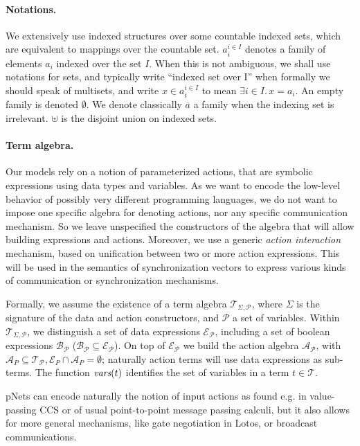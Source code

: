 \documentclass{lncs/llncs}
\def\AlgT{\mathcal{T}}
\renewcommand{\P}{\mathcal P}
\begin{document}
\paragraph*{Notations.}
We extensively use indexed structures
over some countable indexed sets, which are equivalent to mappings over
the countable set. %
$a_i^{i\in I}$
denotes a family of elements $a_i$ indexed over the
set $I$.
When this is not
ambiguous, we shall use notations for sets, and typically write
``indexed set over I'' when formally we should speak of multisets, and
write $x\in a_i^{i\in I}$ to mean $\exists i\in I.\, x=a_i$.  An empty
family is denoted $\emptyset$. We
denote classically $\overline{a}$ a family when the indexing set is
irrelevant.  $\uplus$ is the disjoint union on indexed sets.

\paragraph*{Term algebra.}
Our models rely on a notion of parameterized actions, that are
symbolic expressions using data types and variables. As we want to encode
the low-level behavior of possibly very different
programming languages, we do not want to impose one specific algebra
for denoting actions, nor any specific communication mechanism. So we
leave unspecified the constructors of the algebra that will allow building
expressions and actions. Moreover, we use a generic {\em action interaction}
mechanism, based on unification between two or more action
expressions. This will be used in the semantics of synchronization
vectors to express various kinds of communication or synchronization mechanisms.

\def\Talg{\mathcal{T}_{\Sigma,\P}}
Formally, we assume the existence of a term algebra $\Talg$,
where $\Sigma$ is the signature of the data and action constructors,
and $\P$ a set of variables. Within $\Talg$, we distinguish a set of
data expressions $\mathcal{E}_\P$, including a set of boolean
expressions $\mathcal{B}_{\P}$ ($\mathcal{B}_{\P}\subseteq\mathcal{E}_\P$).
On top of $\mathcal{E}_\P$ we build the action algebra
$\mathcal{A}_\P$, with $\mathcal{A}_P\subseteq\mathcal{T}_\P,
\mathcal{E}_P\cap\mathcal{A}_P=\emptyset$;
naturally action terms will use data expressions as sub-terms.
The function $\vars(t)$ identifies the set of variables in a term
$t\in\AlgT$.

pNets can encode naturally the notion of input actions as found
e.g. in value-passing CCS 
\cite{Milner89} or of usual point-to-point message passing calculi,
but it also allows 
for more general mechanisms, like gate negotiation in Lotos, or broadcast
communications.
\end{document}
